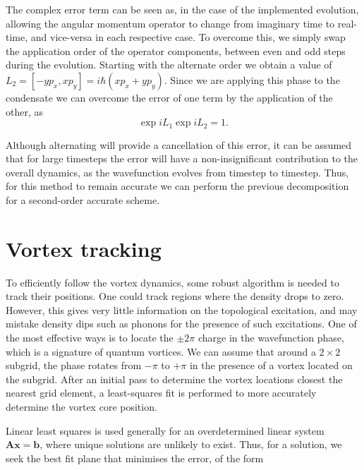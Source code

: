  The complex error term can be seen as, in the case of the implemented evolution, allowing the angular momentum operator to change from imaginary time to real-time, and vice-versa in each respective case. To overcome this, we simply swap the application order of the operator components, between even and odd steps during the evolution. Starting with the alternate order we obtain a value of $L_2 = [-y p_x, x p_y] = i\hbar \left(x p_x + y p_y \right)$. Since we are applying this phase to the condensate we can overcome the error of one term by the application of the other, as
 \begin{equation}
 \exp{i L_1}\exp{i L_2} = 1.
 \end{equation}

 Although alternating will provide a cancellation of this error, it can be assumed that for large timesteps the error will have a non-insignificant contribution to the overall dynamics, as the wavefunction evolves from timestep to timestep. Thus, for this method to remain accurate we can perform the previous decomposition for a second-order accurate scheme.

 \section{Vortex tracking}
 To efficiently follow the vortex dynamics, some robust algorithm is needed to track their positions. One could track regions where the density drops to zero. However, this gives very little information on the topological excitation, and may mistake density dips such as phonons for the presence of such excitations. One of the most effective ways is to locate the $\pm 2\pi$ charge in the wavefunction phase, which is a signature of quantum vortices. We can assume that around a $2\times 2$ subgrid, the phase rotates from $-\pi$ to $+\pi$ in the presence of a vortex located on the subgrid. After an initial pass to determine the vortex locations closest the nearest grid element, a least-squares fit is performed to more accurately determine the vortex core position.


 Linear least squares is used generally for an overdetermined linear system $\mathbf{A}\mathbf{x} = \mathbf{b}$, where unique solutions are unlikely to exist. Thus, for a solution, we seek the best fit plane that minimises the error, of the form

